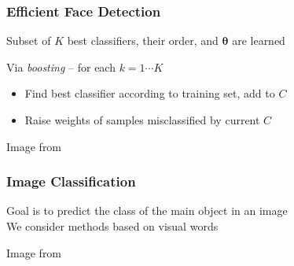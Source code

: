 \documentclass[xetex,professionalfont]{beamer}
\newcommand{\bth}{\boldsymbol{\theta}}
\begin{document}

\begin{frame}
\frametitle{Efficient Face Detection}

Subset of $K$ best classifiers, their order, and $\bth$ are learned

\bigskip
Via \emph{boosting} -- for each $k=1\cdots K$
\begin{itemize}
    \item Find best classifier according to training set, add to $C$ %
    \item Raise weights of samples misclassified by current $C$
\end{itemize}

\bigskip
\begin{center}
    {\centering Image from \cite{szeliski2010}}
\end{center}

\end{frame}


\begin{frame}
\frametitle{Image Classification}

Goal is to predict the class of the main object in an image\\\medskip
We consider methods based on visual words

\medskip
\begin{center}
    {\centering Image from \cite{prince12}}
\end{center}

\end{frame}
\end{document}
